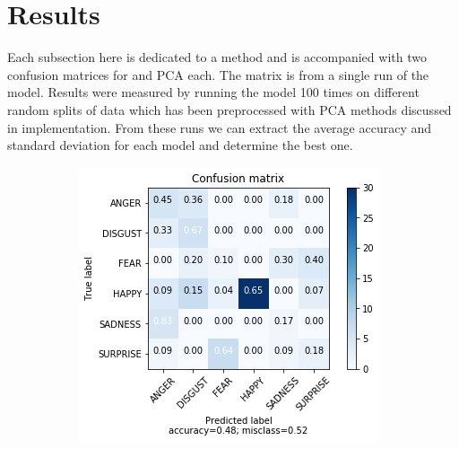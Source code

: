 \section{Results}

Each subsection here is dedicated to a method and is accompanied with two confusion matrices for \tsne and PCA each. The matrix is from a single run of the model. Results were measured by running the model 100 times on different random splits of data which has been preprocessed with PCA methods discussed in implementation. From these runs we can extract the average accuracy and standard deviation for each model and determine the best one.

\begin{figure}
    \centering
    \begin{subfigure}[b]{0.22\textwidth}
        \includegraphics[width=\textwidth]{figures/pca-knn.png}
        \caption{\knn}
        \label{fig:pca-knn}
    \end{subfigure}
    \begin{subfigure}[b]{0.22\textwidth}

\end{subfigure}
\end{figure}
